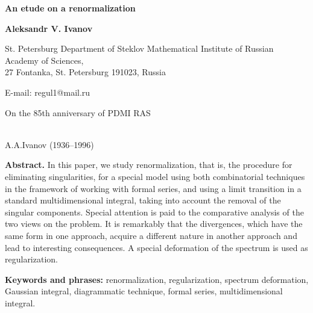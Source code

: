 \documentclass[a4paper]{article}
\begin{document}
\vspace{10mm}
\begin{center}
	\large{\textbf{An etude on a renormalization}}
\end{center}
\vspace{2mm}
\begin{center}
	\large{\textbf{Aleksandr V. Ivanov}}
\end{center}
\begin{center}
St. Petersburg Department of Steklov Mathematical Institute of Russian Academy of Sciences,\\ 
27 Fontanka, St. Petersburg 191023, Russia
\end{center}

\begin{center}
	E-mail: regul1@mail.ru
\end{center}
\begin{flushright}
On the 85th anniversary of PDMI RAS
\end{flushright}
\begin{flushright}
\\
\vspace{0.5mm}
A.A.Ivanov (1936--1996)
\end{flushright}

\vspace{10mm}

\textbf{Abstract.} In this paper, we study renormalization, that is, the procedure for eliminating singularities, for a special model using both combinatorial techniques in the framework of working with formal series, and using a limit transition in a standard multidimensional integral, taking into account the removal of the singular components. Special attention is paid to the comparative analysis of the two views on the problem. It is remarkably that the divergences, which have the same form in one approach, acquire a different nature in another approach and lead to interesting consequences. A special deformation of the spectrum is used as regularization.


\vspace{2mm}
\textbf{Keywords and phrases:} renormalization, regularization, spectrum deformation, Gaussian integral, diagrammatic technique, formal series, multidimensional integral.

\tableofcontents

\newpage	
	
\end{document}
